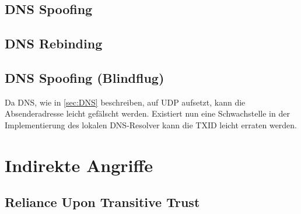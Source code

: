 
\begin{comment}
Wenn sniffing des Netzwerks möglich, dann DNS kein problem, da keinerlei Privicy. Auch bei DNSSEC ein Problem. DNSCrypt, DNSCurve, DNS-over-TLS, DNS-over-HTTPS lösen diese Probleme. Noch kein nativer support in vielen OS (atm nur experimentell in Andoid)
\end{comment}

\subsection{DNS Spoofing}

\begin{comment}
* DNS Spoofing/Faking ermöglicht MitM
* Speziell bei IOT da durch begrenzte Leistung oft keine Verschlüsselung. Bei HTTPS trotzdem Möglichkeiten durch Social-Engineering
\end{comment}

\subsection{DNS Rebinding}

\begin{comment}
Durch DoS von Resolvern oder DNS-Servern können kritischen Unternehmensdienste kurzfristig außer Betrieb genommen werden. Da die Verbindung zwischen diesen hoch vernetzten Diensten stark von DNS abhängt hat der Ausfall eines einzigen zentralen Dienstes (DynDns Vorfall) schwerwiegende Auswirkungen auf alle anhängenden Dienste.
\end{comment}

\subsection{DNS Spoofing (Blindflug)} %
Da DNS, wie in \ref{sec:DNS} beschreiben, auf UDP aufsetzt, kann die Absenderadresse leicht gefälscht werden. Existiert nun eine Schwachstelle in der Implementierung des lokalen DNS-Resolver kann die TXID leicht erraten werden. 

\section{Indirekte Angriffe}

\subsection{Reliance Upon Transitive Trust}

